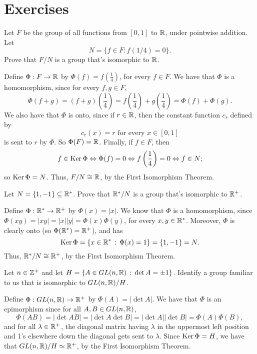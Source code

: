 \pagebreak

\section{Exercises}

\begin{exercise} Let $F$ be the group of all functions from $[0,1]$ to
$\mathbb{R}$, under pointwise addition. Let $$N=\{f\in F:
f(1/4)=0\}.$$  Prove that $F/N$ is a group that's
isomorphic to $\mathbb{R}$.
\end{exercise}

\begin{solution}[print=true]
Define $\Phi:F\rightarrow \mathbb{R}$ by
$\Phi(f)=f\left(\frac{1}{4}\right)$, for every $f\in F$. We have
that $\Phi$ is a homomorphism, since for every $f, g\in F$,
$$\Phi(f+g)=(f+g)\left(\frac{1}{4}\right)=f\left(\frac{1}{4}\right)+g\left(\frac{1}{4}\right)=\Phi(f)+\Phi(g).$$
We also have that $\Phi$ is onto, since if $r\in \mathbb{R}$, then the
constant function $c_r$ defined by $$c_r(x)=r \mbox{ for every $x\in
[0,1]$}$$ is sent to $r$ by $\Phi$.  So $\Phi(F)=\mathbb{R}$. Finally, if
$f\in F$, then
$$f\in \operatorname{Ker} \Phi \Leftrightarrow \Phi(f)=0 \Leftrightarrow
f\left(\frac{1}{4}\right)=0 \Leftrightarrow f\in N;$$ so $\operatorname{Ker}
\Phi=N$.  Thus, $F/N \cong \mathbb{R}$, by the First Isomorphism Theorem.
\end{solution}

\begin{exercise}  Let $N=\{1,-1\}\subseteq \mathbb{R}^*$. Prove that $\mathbb{R}^*/N$ is
 a group that's isomorphic to
$\mathbb{R}^+$.
\end{exercise}

\begin{solution}[print=true]
Define $\Phi: \mathbb{R}^* \rightarrow \mathbb{R}^+$ by
$\Phi(x)=|x|$. We know that $\Phi$ is a homomorphism, since
$\Phi(xy)=|xy|=|x||y|=\Phi(x)\Phi(y)$, for every $x,y\in \mathbb{R}^*$.
Moreover, $\Phi$ is clearly onto (so $\Phi(\mathbb{R}^*)=\mathbb{R}^+$), and
has
$$\operatorname{Ker} \Phi=\{x\in \mathbb{R}^*\,:\,\Phi(x)=1\}=\{1,-1\}=N.$$  Thus,
$\mathbb{R}^*/N \cong \mathbb{R}^+$, by the First Isomorphism Theorem.
\end{solution}

\begin{exercise} Let $n\in \mathbb{Z}^+$ and let $H=\{A\in GL(n,\mathbb{R})\,:\, \det A =\pm
1\}$.  Identify a group familiar to us that is isomorphic to
$GL(n,\mathbb{R})/H$.
\end{exercise}

\begin{solution}[print=true]
Define $\Phi:GL(n,\mathbb{R})\to \mathbb{R}^+$ by
$\Phi(A)=|\det A|$.  We have that $\Phi$ is an epimorphism since for
all $A,B\in GL(n,\mathbb{R})$, $$\Phi(AB)=|\det AB|=|\det A \det B|=|\det
A||\det B|=\Phi(A)\Phi(B),$$ and for all $\lambda \in \mathbb{R}^+$, the
diagonal matrix having $\lambda$ in the uppermost left position and
1's elsewhere down the diagonal gets sent to $\lambda$. Since $\operatorname{Ker}
\Phi=H$, we have that $GL(n,\mathbb{R})/H \simeq \mathbb{R}^+$, by the First
Isomorphism Theorem.
\end{solution}

